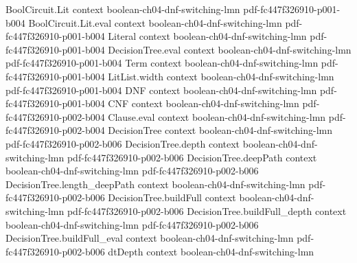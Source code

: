\begin{theorem}
\label{LMN.depth3_switching_bound}
\leanok
{}
\proofstep
  {BoolCircuit.Lit}
  {context}
  {boolean-ch04-dnf-switching-lmn}
  {pdf-fc447f326910-p001-b004}
\proofstep
  {BoolCircuit.Lit.eval}
  {context}
  {boolean-ch04-dnf-switching-lmn}
  {pdf-fc447f326910-p001-b004}
\proofstep
  {Literal}
  {context}
  {boolean-ch04-dnf-switching-lmn}
  {pdf-fc447f326910-p001-b004}
\proofstep
  {DecisionTree.eval}
  {context}
  {boolean-ch04-dnf-switching-lmn}
  {pdf-fc447f326910-p001-b004}
\proofstep
  {Term}
  {context}
  {boolean-ch04-dnf-switching-lmn}
  {pdf-fc447f326910-p001-b004}
\proofstep
  {LitList.width}
  {context}
  {boolean-ch04-dnf-switching-lmn}
  {pdf-fc447f326910-p001-b004}
\proofstep
  {DNF}
  {context}
  {boolean-ch04-dnf-switching-lmn}
  {pdf-fc447f326910-p001-b004}
\proofstep
  {CNF}
  {context}
  {boolean-ch04-dnf-switching-lmn}
  {pdf-fc447f326910-p002-b004}
\proofstep
  {Clause.eval}
  {context}
  {boolean-ch04-dnf-switching-lmn}
  {pdf-fc447f326910-p002-b004}
\proofstep
  {DecisionTree}
  {context}
  {boolean-ch04-dnf-switching-lmn}
  {pdf-fc447f326910-p002-b006}
\proofstep
  {DecisionTree.depth}
  {context}
  {boolean-ch04-dnf-switching-lmn}
  {pdf-fc447f326910-p002-b006}
\proofstep
  {DecisionTree.deepPath}
  {context}
  {boolean-ch04-dnf-switching-lmn}
  {pdf-fc447f326910-p002-b006}
\proofstep
  {DecisionTree.length_deepPath}
  {context}
  {boolean-ch04-dnf-switching-lmn}
  {pdf-fc447f326910-p002-b006}
\proofstep
  {DecisionTree.buildFull}
  {context}
  {boolean-ch04-dnf-switching-lmn}
  {pdf-fc447f326910-p002-b006}
\proofstep
  {DecisionTree.buildFull_depth}
  {context}
  {boolean-ch04-dnf-switching-lmn}
  {pdf-fc447f326910-p002-b006}
\proofstep
  {DecisionTree.buildFull_eval}
  {context}
  {boolean-ch04-dnf-switching-lmn}
  {pdf-fc447f326910-p002-b006}
\proofstep
  {dtDepth}
  {context}
  {boolean-ch04-dnf-switching-lmn}

\end{theorem}
